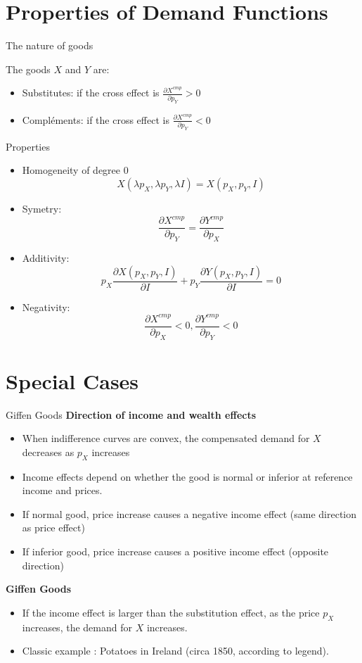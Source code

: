 \documentclass[handout]{beamer}
\newenvironment{iPar}[1]{\textbf{#1} \begin{itemize}}{\end{itemize}}
\newcommand{\cp}{{cmp}}
\begin{document}
\section{Properties of Demand Functions}

\begin{frame}{The nature of goods}

The goods $X$ and $Y$ are:
\begin{itemize}
\item Substitutes: if the cross effect is $\frac{\partial X^\cp}{\partial p_Y} >0$
\item Compléments: if the cross effect is $\frac{\partial X^\cp}{\partial p_Y} <0$ 
\end{itemize}

\end{frame}

\begin{frame}{Properties}

\begin{itemize}
\item Homogeneity of degree 0 $$X(\lambda p_X,\lambda p_Y,\lambda I) = X(p_X,p_Y,I)$$ 
\item Symetry: $$\frac{\partial X^\cp}{\partial p_Y} =\frac{\partial Y^\cp}{\partial p_X} $$ 
\item Additivity: $$ p_X \frac{\partial X(p_X,p_Y,I)}{\partial I} + p_Y \frac{\partial Y(p_X,p_Y,I)}{\partial I} = 0 $$
\item Negativity: $$\frac{\partial X^\cp}{\partial p_X}<0,\frac{\partial Y^\cp}{\partial p_Y}<0$$

\end{itemize}

\end{frame}

\section{Special Cases}

\begin{frame}{Giffen Goods}
\begin{iPar}{Direction of income and wealth effects}
\item When indifference curves are convex, the compensated demand for $X$ decreases as $p_X$ increases
\item Income effects depend on whether the good is normal or inferior at reference income and prices.
\item If normal good, price increase causes a negative income effect (same direction as price effect)
\item If inferior good, price increase causes a positive income effect (opposite direction)
\end{iPar}

\begin{iPar}{Giffen Goods}
\item If the income effect is larger than the substitution effect, as the price $p_X$ increases, the demand for $X$ increases.
\item  Classic example : Potatoes in Ireland (circa 1850, according to legend). 
\end{iPar}
\end{frame}
\end{document}
